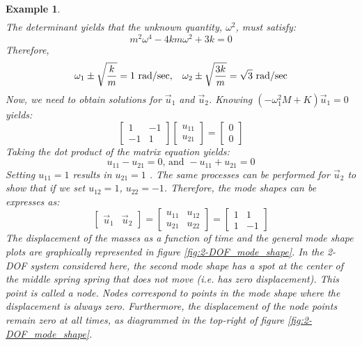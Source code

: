 \documentclass[12pt,letter]{article}
\newtheorem{ex}{Example}
\numberwithin{ex}{section} %
\newenvironment{example}{\begin{mdframed}[middlelinewidth=0.5mm]\begin{ex}\normalfont}{\end{ex}\end{mdframed}}
\numberwithin{re}{section} %
\begin{document}
\begin{example}
\begin{eqnarray}
\end{eqnarray}
The determinant yields that the unknown quantity, $\omega^2$, must satisfy:
\begin{equation}
m^2 \omega^4 - 4km\omega^2 + 3k = 0
\end{equation}
Therefore, 
\begin{equation}
\omega_1 \pm \sqrt{\frac{k}{m}}=1 \text{ rad/sec}, \hspace{2ex} \omega_2 \pm \sqrt{\frac{3k}{m}}=\sqrt{3} \text{ rad/sec}
\end{equation}
Now, we need to obtain solutions for $\vec{u}_1$ and $\vec{u}_2$. Knowing $(-\omega_1^2 M  + K)\vec{u}_1 =0$ yields:
\begin{equation}
	 \begin{bmatrix} 1 & -1 \\    -1  & 1 \end{bmatrix} 
	 \begin{bmatrix} u_{11}\\ u_{21}\end{bmatrix}=\begin{bmatrix} 0\\ 0\end{bmatrix}
\end{equation}
Taking the dot product of the matrix equation yields:
\begin{equation}
	u_{11} - u_{21}=0 \text{, and } - u_{11} + u_{21}=0
\end{equation}
Setting $u_{11} = 1$ results in $u_{21} = 1$ . The same processes can be performed for $\vec{u}_2$ to show that if we set $u_{12} = 1$, $u_{22} = -1$. Therefore, the mode shapes can be expresses as:
\begin{equation}
	 \begin{bmatrix} \vec{u}_1 & \vec{u}_2 \end{bmatrix} = \begin{bmatrix}  u_{11} & u_{12} \\ u_{21} & u_{22} \end{bmatrix} = \begin{bmatrix}  1 & 1 \\ 1 & -1 \end{bmatrix}
\end{equation}
The displacement of the masses as a function of time and the general mode shape plots are graphically represented in figure \ref{fig:2-DOF_mode_shape}. In the 2-DOF system considered here, the second mode shape has a spot at the center of the middle spring spring that does not move (i.e. has zero displacement). This point is called a node. Nodes correspond to points in the mode shape where the displacement is always zero. Furthermore, the displacement of the node points remain zero at all times, as diagrammed in the top-right of figure \ref{fig:2-DOF_mode_shape}.


\end{example}
\end{document}
